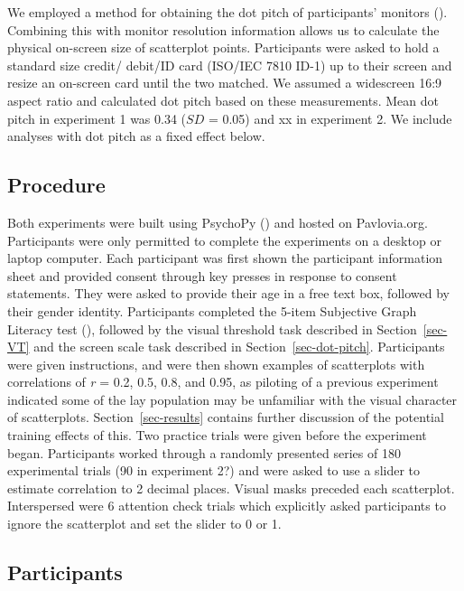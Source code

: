 \documentclass[manuscript, review, anonymous, screen]{acmart}
\begin{document}
We employed a method for obtaining the dot pitch of participants'
monitors (\citet{screenscale}). Combining this with monitor resolution
information allows us to calculate the physical on-screen size of
scatterplot points. Participants were asked to hold a standard size
credit/ debit/ID card (ISO/IEC 7810 ID-1) up to their screen and resize
an on-screen card until the two matched. We assumed a widescreen 16:9
aspect ratio and calculated dot pitch based on these measurements. Mean
dot pitch in experiment 1 was 0.34 (\(SD\) = 0.05) and xx in experiment
2. We include analyses with dot pitch as a fixed effect below.

\hypertarget{sec-gen-procedure}{%
\subsection{Procedure}\label{sec-gen-procedure}}

Both experiments were built using PsychoPy (\citet{pierce_2019}) and
hosted on Pavlovia.org. Participants were only permitted to complete the
experiments on a desktop or laptop computer. Each participant was first
shown the participant information sheet and provided consent through key
presses in response to consent statements. They were asked to provide
their age in a free text box, followed by their gender identity.
Participants completed the 5-item Subjective Graph Literacy test
(\citet{garcia_2016}), followed by the visual threshold task described
in Section~\ref{sec-VT} and the screen scale task described in
Section~\ref{sec-dot-pitch}. Participants were given instructions, and
were then shown examples of scatterplots with correlations of \emph{r} =
0.2, 0.5, 0.8, and 0.95, as piloting of a previous experiment indicated
some of the lay population may be unfamiliar with the visual character
of scatterplots. Section~\ref{sec-results} contains further discussion
of the potential training effects of this. Two practice trials were
given before the experiment began. Participants worked through a
randomly presented series of 180 experimental trials (90 in experiment
2?) and were asked to use a slider to estimate correlation to 2 decimal
places. Visual masks preceded each scatterplot. Interspersed were 6
attention check trials which explicitly asked participants to ignore the
scatterplot and set the slider to 0 or 1.

\hypertarget{sec-participants}{%
\subsection{Participants}\label{sec-participants}}
\end{document}
